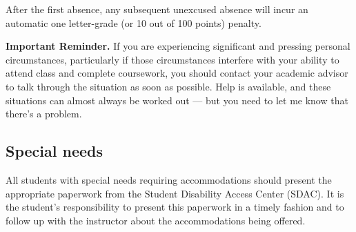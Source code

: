 \documentclass[oneside,11pt]{amsart}
\begin{document}
After the first absence, any subsequent unexcused absence will incur an automatic one letter-grade (or 10 out of 100 points) penalty.

\medskip\noindent
\textbf{Important Reminder.}
If you are experiencing significant and pressing personal circumstances, particularly if those circumstances interfere with your ability to attend class and complete coursework, you should contact your academic advisor to talk through the situation as soon as possible. Help is available, and these situations can almost always be worked out --- but you need to let me know that there's a problem.



\subsection{Special needs}

All students with special needs requiring accommodations should present the appropriate paperwork from the Student Disability Access Center (SDAC). It is the student's responsibility to present this paperwork in a timely fashion and to follow up with the instructor about the accommodations being offered.
%
\end{document}
